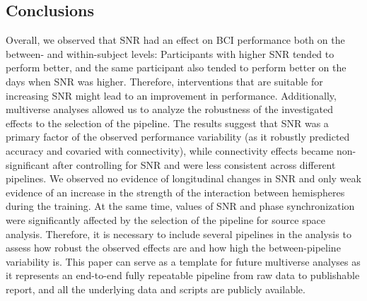 \subsection{Conclusions}

Overall, we observed that SNR had an effect on BCI performance both on the between- and within-subject levels: Participants with higher SNR tended to perform better, and the same participant also tended to perform better on the days when SNR was higher. Therefore, interventions that are suitable for increasing SNR might lead to an improvement in performance. Additionally, multiverse analyses allowed us to analyze the robustness of the investigated effects to the selection of the pipeline. The results suggest that SNR was a primary factor of the observed performance variability (as it robustly predicted accuracy and covaried with connectivity), while connectivity effects became non-significant after controlling for SNR and were less consistent across different pipelines. We observed no evidence of longitudinal changes in SNR and only weak evidence of an increase in the strength of the interaction between hemispheres during the training. At the same time, values of SNR and phase synchronization were significantly affected by the selection of the pipeline for source space analysis. Therefore, it is necessary to include several pipelines in the analysis to assess how robust the observed effects are and how high the between-pipeline variability is. This paper can serve as a template for future multiverse analyses as it represents an end-to-end fully repeatable pipeline from raw data to publishable report, and all the underlying data and scripts are publicly available.

